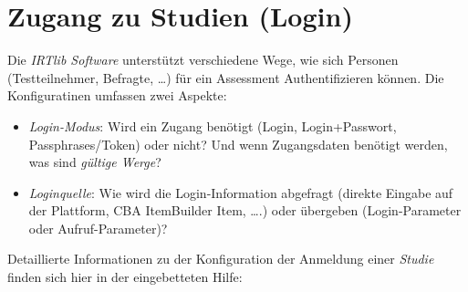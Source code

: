 \documentclass[
  letterpaper,
  DIV=11]{scrreprt}
\providecommand{\tightlist}{%
  \setlength{\itemsep}{0pt}\setlength{\parskip}{0pt}}\usepackage{longtable,booktabs,array}
\begin{document}
\hypertarget{zugang-zu-studien-login-1}{%
\section{Zugang zu Studien (Login)}\label{zugang-zu-studien-login-1}}

Die \emph{IRTlib Software} unterstützt verschiedene Wege, wie sich
Personen (Testteilnehmer, Befragte, \ldots) für ein Assessment
Authentifizieren können. Die Konfiguratinen umfassen zwei Aspekte:

\begin{itemize}
\tightlist
\item
  \emph{Login-Modus}: Wird ein Zugang benötigt (Login, Login+Passwort,
  Passphrases/Token) oder nicht? Und wenn Zugangsdaten benötigt werden,
  was sind \emph{gültige Werge}?
\item
  \emph{Loginquelle}: Wie wird die Login-Information abgefragt (direkte
  Eingabe auf der Plattform, CBA ItemBuilder Item, \ldots.) oder
  übergeben (Login-Parameter oder Aufruf-Parameter)?
\end{itemize}

Detaillierte Informationen zu der Konfiguration der Anmeldung einer
\emph{Studie} finden sich hier in der eingebetteten Hilfe:
\end{document}
